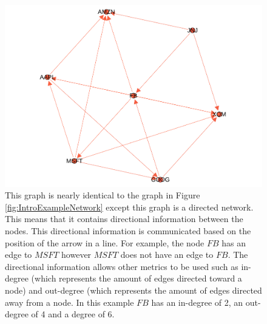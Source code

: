 \begin{figure}[!htb]
    \centering
     \includegraphics[width=\textwidth]{figures/Intro/ExampleNetworkDirected.pdf}
    \caption{
This graph is nearly identical to the graph in Figure \ref{fig:IntroExampleNetwork} except this graph is a directed network. This means that it contains directional information between the nodes. This directional information is communicated based on the position of the arrow in a line. For example, the node \(FB\) has an edge to \(MSFT\) however \(MSFT\) does not have an edge to \(FB\). The directional information allows other metrics to be used such as in-degree (which represents the amount of edges directed toward a node) and out-degree (which represents the amount of edges directed away from a node. In this example \(FB\) has an in-degree of 2, an out-degree of 4 and a degree of 6.
      }
	\label{fig:ExampleNetworkDirected}
\end{figure}



